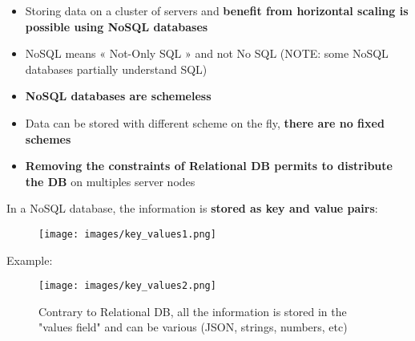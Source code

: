 \documentclass{beamer}[10pt, usepdftitle=false handout]
\begin{document}
	\begin{frame}
	
	\begin{itemize}
	\item{Storing data on a cluster of servers and \textbf{benefit from horizontal scaling is possible using NoSQL databases}}
	\item{NoSQL means « Not-Only SQL » and not No SQL (NOTE: some NoSQL databases partially understand SQL)}
	\item{\textbf{NoSQL databases are schemeless}}
	\item{Data can be stored with different scheme on the fly, \textbf{there are no fixed schemes}}
	\item{\textbf{Removing the constraints of Relational DB permits to distribute the DB} on multiples server nodes}	
	\end{itemize}
	
	\end{frame}
	
	\begin{frame}
	
	In a NoSQL database, the information is \textbf{stored as key and value pairs}:
	\vspace{0.6em}

	\begin{figure}
	\texttt{[image: images/key\_values1.png]} 
	\end{figure}
	
	Example:
	\vspace*{0.6em}	
	
	\begin{figure}
	\texttt{[image: images/key\_values2.png]} 
     	\vspace*{-0.5em}
		\caption{Contrary to Relational DB, all the information is stored in the "values field" and can be various (JSON, strings, numbers, etc)}
	\end{figure}		
		
	
	\end{frame}
	
\end{document}
